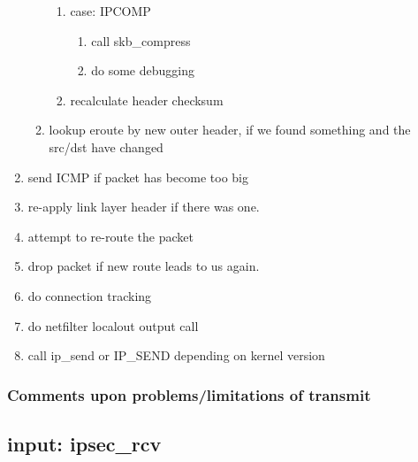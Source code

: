 \begin{enumerate}
\begin{enumerate}
\begin{enumerate}
			\item case: IPCOMP
			\begin{enumerate}
				\item call skb\_compress
				\item do some debugging
			\end{enumerate}
			\item recalculate header checksum
		\end{enumerate}
		\item lookup eroute by new outer header, if we found
			something and the src/dst have changed
	\end{enumerate}
	\item send ICMP if packet has become too big
	\item re-apply link layer header if there was one.
	\item attempt to re-route the packet
	\item drop packet if new route leads to us again.
	\item do connection tracking
	\item do netfilter localout output call
	\item call ip\_send or IP\_SEND depending on kernel version
\end{enumerate}

\subsubsection{Comments upon problems/limitations of transmit}

\subsection{input: ipsec\_rcv}

